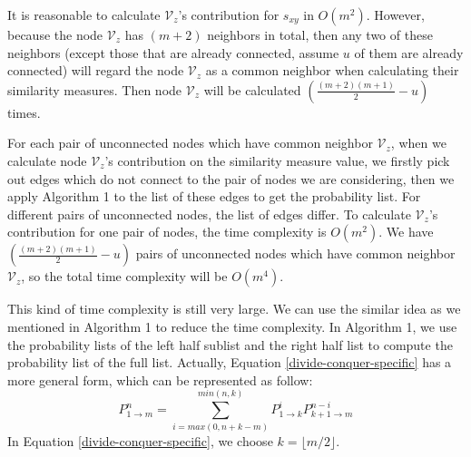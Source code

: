 \documentclass[\main/thesis.tex]{subfiles}
\begin{document}
It is reasonable to calculate $\mathcal{V}_z$'s contribution for $s_{xy}$ in $O(m^2)$. However, because the node $\mathcal{V}_z$ has $(m+2)$ neighbors in total, then any two of these neighbors (except those that are already connected, assume $u$ of them are already connected) will regard the node $\mathcal{V}_z$ as a common neighbor when calculating their similarity measures. Then node $\mathcal{V}_z$ will be calculated $(\frac{(m+2)(m+1)}{2}-u)$ times. 


For each pair of unconnected nodes which have common neighbor $\mathcal{V}_z$, when we calculate node $\mathcal{V}_z$'s contribution on the similarity measure value, we firstly pick out edges which do not connect to the pair of nodes we are considering, then we apply Algorithm 1 to the list of these edges to get the probability list. For different pairs of unconnected nodes, the list of edges differ. To calculate $\mathcal{V}_z$'s contribution for one pair of nodes, the time complexity is $O(m^2)$. We have $(\frac{(m+2)(m+1)}{2}-u)$ pairs of unconnected nodes which have common neighbor $\mathcal{V}_z$, so the total time complexity will be $O(m^4)$.

This kind of time complexity is still very large. We can use the similar idea as we mentioned in Algorithm 1 to reduce the time complexity. In Algorithm 1, we use the probability lists of the left half sublist and the right half list to compute the probability list of the full list. Actually, Equation \ref{divide-conquer-specific} has a more general form, which can be represented as follow:
\begin{equation}
P_{1\rightarrow m}^n=\sum_{i=max(0,n+k-m)}^{min(n,k)}P_{1\rightarrow k}^i P_{k+1\rightarrow m}^{n-i}
\label{divide-conquer-general}
\end{equation}
In Equation \ref{divide-conquer-specific}, we choose $k=\lfloor m/2 \rfloor$.
\end{document}
